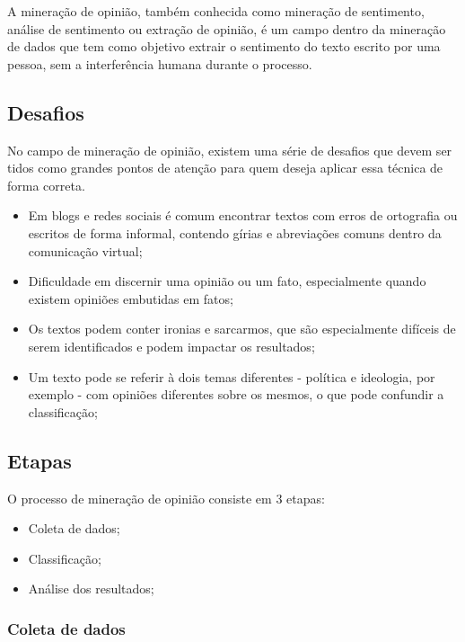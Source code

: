 A mineração de opinião, também conhecida como mineração de sentimento, análise de sentimento ou extração de opinião, é um campo dentro da mineração de dados \cite{santos2014mineraccao} que tem como objetivo extrair o sentimento do texto escrito por uma pessoa, sem a interferência humana durante o processo.

\subsection{Desafios}

No campo de mineração de opinião, existem uma série de desafios que devem ser tidos como grandes pontos de atenção para quem deseja aplicar essa técnica de forma correta. 

\begin{itemize}
	\item Em blogs e redes sociais é comum encontrar textos com erros de ortografia ou escritos de forma informal, contendo gírias e abreviações comuns dentro da comunicação virtual;
	\item Dificuldade em discernir uma opinião ou um fato, especialmente quando existem opiniões embutidas em fatos;
	\item Os textos podem conter ironias e sarcarmos, que são especialmente difíceis de serem identificados e podem impactar os resultados;
	\item Um texto pode se referir à dois temas diferentes - política e ideologia, por exemplo - com opiniões diferentes sobre os mesmos, o que pode confundir a classificação;
\end{itemize}

\subsection{Etapas}

O processo de mineração de opinião consiste em 3 etapas: \cite{mineracaoopiniaoufsc}

\begin{itemize}
	\item Coleta de dados;
	\item Classificação;
	\item Análise dos resultados;
\end{itemize}

\subsubsection{Coleta de dados}

